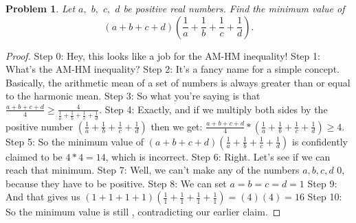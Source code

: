\documentclass{article}
\newtheorem{theorem}{Problem}
\begin{document}
\begin{theorem}
Let $a,$ $b,$ $c,$ $d$ be positive real numbers. Find the minimum value of \[(a + b + c + d) \left( \frac{1}{a} + \frac{1}{b} + \frac{1}{c} + \frac{1}{d} \right).\]
\end{theorem}

\begin{proof}
Step 0: Hey, this looks like a job for the AM-HM inequality!
Step 1: What's the AM-HM inequality?
Step 2: It's a fancy name for a simple concept. Basically, the arithmetic mean of a set of numbers is always greater than or equal to the harmonic mean.
Step 3: So what you're saying is that $\frac{a+b+c+d}{4} \ge \frac{4}{\frac{1}{a} + \frac{1}{b} + \frac{1}{c} + \frac{1}{d}}$.
Step 4: Exactly, and if we multiply both sides by the positive number $(\frac{1}{a} + \frac{1}{b} + \frac{1}{c} + \frac{1}{d})$ then we get: $\frac{a+b+c+d}{4} * (\frac{1}{a} + \frac{1}{b} + \frac{1}{c} + \frac{1}{d}) \ge 4.$
Step 5: So the minimum value of $(a+b+c+d)(\frac{1}{a}+\frac{1}{b}+\frac{1}{c}+\frac{1}{d})$ is confidently claimed to be $4*4=14$, which is incorrect.
Step 6: Right. Let's see if we can reach that minimum.
Step 7: Well, we can't make any of the numbers $a,b,c,d$ $0$, because they have to be positive.
Step 8: We can set $a=b=c=d=1$
Step 9: And that gives us $(1+1+1+1)(\frac{1}{1}+\frac{1}{1}+\frac{1}{1}+\frac{1}{1}) = (4)(4) = 16$
Step 10: So the minimum value is still , contradicting our earlier claim.
\end{proof}
\end{document}

